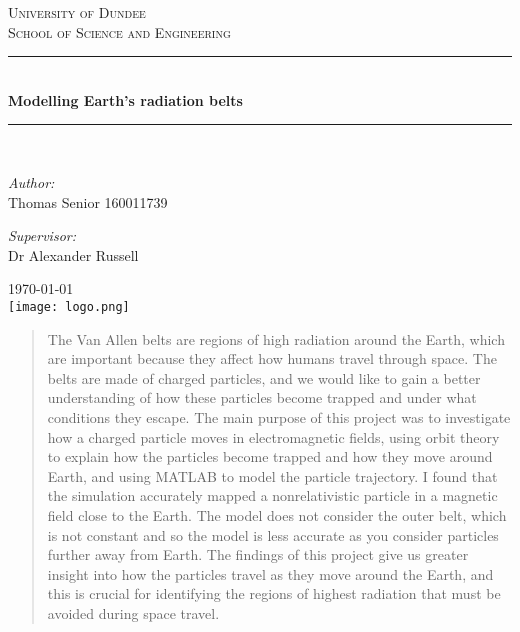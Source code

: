 \documentclass[14paper,11pt,hidelinks]{article}
\begin{document}
\begin{titlepage}

\newcommand{\HRule}{\rule{\linewidth}{0.5mm}}
\center
\textsc{\LARGE  University  of Dundee}\\[1.5cm]
\textsc{\Large School of Science and Engineering}\\[0.5cm]
\HRule \\[0.4cm]
{ \huge \bfseries Modelling Earth's radiation belts}\\[0.4cm]
\HRule \\[1.5cm]
\begin{minipage}{0.4\textwidth}
\begin{flushleft} \large
\emph{Author:}\\
Thomas Senior 160011739
\end{flushleft}
\begin{flushleft} \large
\emph{Supervisor:}\\
Dr Alexander Russell
\end{flushleft}
\end{minipage}
{\large \today}\\[2cm]
\texttt{[image: logo.png]}\\[1cm]
\end{titlepage}

\newpage
\tableofcontents
\newpage
\begin{abstract}
\noindent

The Van Allen belts are regions of high radiation around the Earth, which are important because they affect how humans travel through space. The belts are made of charged particles, and we would like to gain a better understanding of how these particles become trapped and under what conditions they escape. The main purpose of this project was to investigate how a charged particle moves in electromagnetic fields, using orbit theory to explain how the particles become trapped and how they move around Earth, and using MATLAB to model the particle trajectory. I found that the simulation accurately mapped a nonrelativistic particle in a magnetic field close to the Earth. The model does not consider the outer belt, which is not constant and so the model is less accurate as you consider particles further away from Earth. The findings of this project give us greater insight into how the particles travel as they move around the Earth, and this is crucial for identifying the regions of highest radiation that must be avoided during space travel. 





\end{abstract}
\newpage
\end{document}
